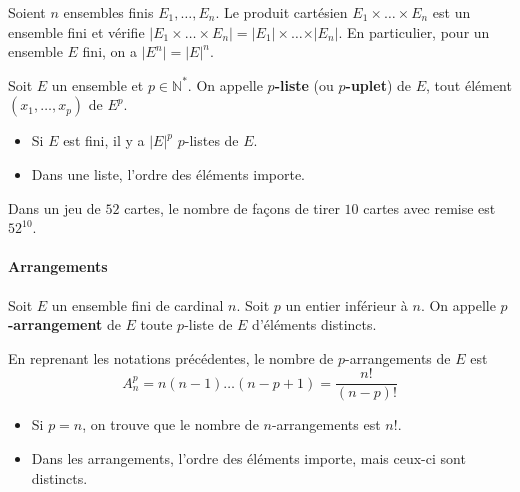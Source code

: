 
  \begin{proposition}
    Soient $n$ ensembles finis $E_1, \dots, E_n$. Le produit cartésien $E_1 \times \dots \times E_n$ est un ensemble fini et vérifie $\vert E_1 \times \dots \times E_n \vert = \vert E_1 \vert \times \dots \times \vert E_n \vert$. En particulier, pour un ensemble $E$ fini, on a $\vert E^n \vert = \vert E \vert^n$.
  \end{proposition}

  \begin{definition}
    Soit $E$ un ensemble et $p \in \mathbb{N}^*$. On appelle \textbf{$p$-liste} (ou \textbf{$p$-uplet}) de $E$, tout élément $(x_1, \dots, x_p)$ de $E^p$.
  \end{definition}

  \begin{remark}
    \begin{itemize}
      \item Si $E$ est fini, il y a $\vert E \vert^p$ $p$-listes de $E$.
      \item Dans une liste, l'ordre des éléments importe.
    \end{itemize}
  \end{remark}

  \begin{example}
    Dans un jeu de $52$ cartes, le nombre de façons de tirer $10$ cartes avec remise est $52^{10}$.
  \end{example}

  \paragraph{Arrangements}

  \begin{definition}
    Soit $E$ un ensemble fini de cardinal $n$. Soit $p$ un entier inférieur à $n$. On appelle \textbf{$p$-arrangement} de $E$ toute $p$-liste de $E$ d'éléments distincts.
  \end{definition}

  \begin{proposition}
    En reprenant les notations précédentes, le nombre de $p$-arrangements de $E$ est
    \[ A_n^p = n(n-1) \dots (n-p+1) = \frac{n!}{(n-p)!} \]
  \end{proposition}

  \begin{remark}
    \begin{itemize}
      \item Si $p = n$, on trouve que le nombre de $n$-arrangements est $n!$.
      \item Dans les arrangements, l'ordre des éléments importe, mais ceux-ci sont distincts.
    \end{itemize}
  \end{remark}

